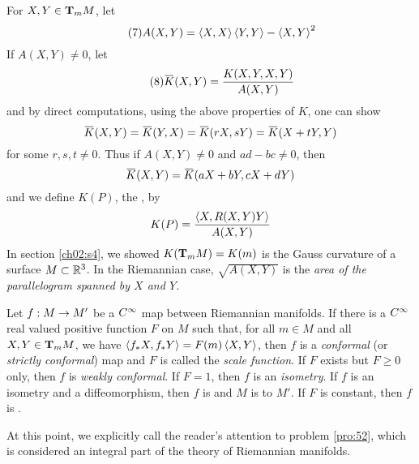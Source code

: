 \documentclass[../main]{subfiles}
\begin{document}
For $X,Y\in\tangentspace{M}{m}$, let
\begin{equation}\tag{7} \label{eqn:ch6.2.5}
    A(X,Y) = \ip{X}{X}\ip{Y}{Y}-\ip{X}{Y}^2
\end{equation}
If $A(X,Y)\ne0$, let
\begin{equation}\tag{8} \label{eqn:ch6.2.6}
    \xoverline K(X,Y) = \frac{K(X,Y,X,Y)}{A(X,Y)}
\end{equation}
and by direct computations, using the above properties of $K$, one can show
\[\xoverline K(X,Y) = \xoverline K(Y,X) = \xoverline K(rX,sY) = \xoverline K(X+tY,Y)\]
for some $r,s,t\ne0$. Thus if $A(X,Y)\ne0$ and $ad-bc\ne0$, then
\[\xoverline K(X,Y) = \xoverline K(aX+bY,cX+dY)\]
and we define $K(P)$, the , by
\[K(P) = \frac{\ip{X}{R(X,Y)Y}}{A(X,Y)}\]
In section \ref{ch02:s4}, we showed $K(\tangentspace{M}{m})=K(m)$ is the Gauss curvature of a surface $M\subset\bR^3$. In the Riemannian case, $\sqrt{A(X,Y)}$ is the \emph{area of the parallelogram spanned by $X$ and $Y$.}

Let $f:M\functionMaps M'$ be a $\CInfty$ map between Riemannian manifolds. If there is a $\CInfty$ real valued positive function $F$ on $M$ such that, for all $m\in M$ and all $X,Y\in\tangentspace{M}{m}$, we have $\ip{f_*X}{f_*Y}=F(m)\ip{X}{Y}$, then $f$ is a \emph{conformal} (or \emph{strictly conformal}) map and $F$ is called the \emph{scale function}. If $F$ exists but $F\ge0$ only, then $f$ is \emph{weakly conformal}. If $F=1$, then $f$ is an \emph{isometry}. If $f$ is an isometry and a diffeomorphism, then $f$ is  and $M$ is  to $M'$. If $F$ is constant, then $f$ is .

At this point, we explicitly call the reader's attention to problem \ref{pro:52}, which is considered an integral part of the theory of Riemannian manifolds.
\end{document}
